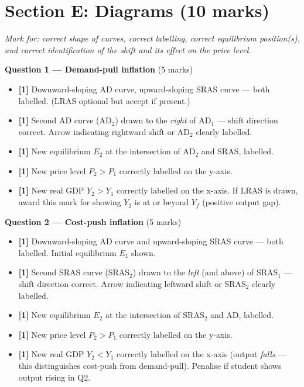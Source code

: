\documentclass[12pt,a4paper]{article}
\begin{document}
\newpage

\section*{Section E: Diagrams (10 marks)}

\textit{Mark for: correct shape of curves, correct labelling, correct equilibrium position(s), and correct identification of the shift and its effect on the price level.}

\vspace{0.5em}

\textbf{Question 1 --- Demand-pull inflation} \hfill (5 marks)

\begin{itemize}
    \item \textbf{[1]} Downward-sloping AD curve, upward-sloping SRAS curve --- both labelled. (LRAS optional but accept if present.)
    \item \textbf{[1]} Second AD curve (AD$_2$) drawn to the \textit{right} of AD$_1$ --- shift direction correct. Arrow indicating rightward shift or AD$_2$ clearly labelled.
    \item \textbf{[1]} New equilibrium $E_2$ at the intersection of AD$_2$ and SRAS, labelled.
    \item \textbf{[1]} New price level $P_2 > P_1$ correctly labelled on the y-axis.
    \item \textbf{[1]} New real GDP $Y_2 > Y_1$ correctly labelled on the x-axis. If LRAS is drawn, award this mark for showing $Y_2$ is at or beyond $Y_f$ (positive output gap).
\end{itemize}

\vspace{0.8em}

\textbf{Question 2 --- Cost-push inflation} \hfill (5 marks)

\begin{itemize}
    \item \textbf{[1]} Downward-sloping AD curve and upward-sloping SRAS curve --- both labelled. Initial equilibrium $E_1$ shown.
    \item \textbf{[1]} Second SRAS curve (SRAS$_2$) drawn to the \textit{left} (and above) of SRAS$_1$ --- shift direction correct. Arrow indicating leftward shift or SRAS$_2$ clearly labelled.
    \item \textbf{[1]} New equilibrium $E_2$ at the intersection of SRAS$_2$ and AD, labelled.
    \item \textbf{[1]} New price level $P_2 > P_1$ correctly labelled on the y-axis.
    \item \textbf{[1]} New real GDP $Y_2 < Y_1$ correctly labelled on the x-axis (output \textit{falls} --- this distinguishes cost-push from demand-pull). Penalise if student shows output rising in Q2.
\end{itemize}
\end{document}

